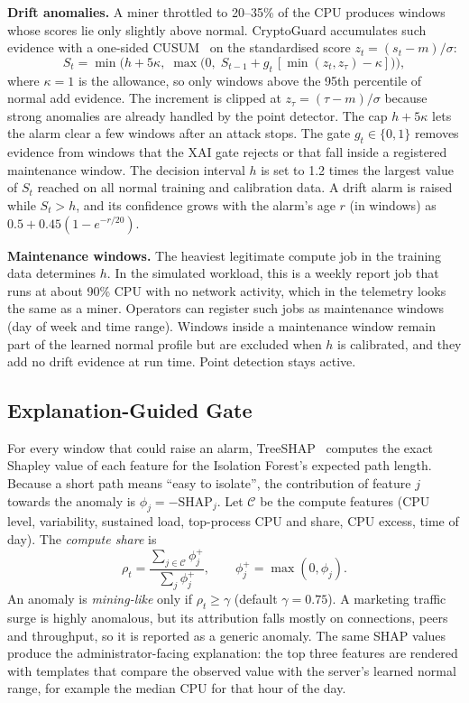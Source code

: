 \documentclass[conference]{IEEEtran}
\begin{document}
\textbf{Drift anomalies.} A miner throttled to 20--35\% of the CPU produces windows whose scores lie only slightly above normal. CryptoGuard accumulates such evidence with a one-sided CUSUM~\cite{page1954} on the standardised score $z_t=(s_t-m)/\sigma$:
\begin{equation}
  S_t = \min\!\Big(h + 5\kappa,\; \max\!\big(0,\; S_{t-1} + g_t\,[\min(z_t, z_\tau) - \kappa]\big)\Big),
  \label{eq:cusum}
\end{equation}
where $\kappa=1$ is the allowance, so only windows above the 95th percentile of normal add evidence. The increment is clipped at $z_\tau=(\tau-m)/\sigma$ because strong anomalies are already handled by the point detector. The cap $h+5\kappa$ lets the alarm clear a few windows after an attack stops. The gate $g_t\in\{0,1\}$ removes evidence from windows that the XAI gate rejects or that fall inside a registered maintenance window. The decision interval $h$ is set to 1.2 times the largest value of $S_t$ reached on all normal training and calibration data. A drift alarm is raised while $S_t>h$, and its confidence grows with the alarm's age $r$ (in windows) as $0.5+0.45(1-e^{-r/20})$.

\textbf{Maintenance windows.} The heaviest legitimate compute job in the training data determines $h$. In the simulated workload, this is a weekly report job that runs at about 90\% CPU with no network activity, which in the telemetry looks the same as a miner. Operators can register such jobs as maintenance windows (day of week and time range). Windows inside a maintenance window remain part of the learned normal profile but are excluded when $h$ is calibrated, and they add no drift evidence at run time. Point detection stays active.

\subsection{Explanation-Guided Gate}
For every window that could raise an alarm, TreeSHAP~\cite{lundberg2020trees} computes the exact Shapley value of each feature for the Isolation Forest's expected path length. Because a short path means ``easy to isolate'', the contribution of feature $j$ towards the anomaly is $\phi_j=-\mathrm{SHAP}_j$. Let $\mathcal{C}$ be the compute features (CPU level, variability, sustained load, top-process CPU and share, CPU excess, time of day). The \emph{compute share} is
\begin{equation}
  \rho_t = \frac{\sum_{j\in\mathcal{C}} \phi_j^+}{\sum_j \phi_j^+}, \qquad \phi_j^+=\max(0,\phi_j).
\end{equation}
An anomaly is \emph{mining-like} only if $\rho_t\ge\gamma$ (default $\gamma=0.75$). A marketing traffic surge is highly anomalous, but its attribution falls mostly on connections, peers and throughput, so it is reported as a generic anomaly. The same SHAP values produce the administrator-facing explanation: the top three features are rendered with templates that compare the observed value with the server's learned normal range, for example the median CPU for that hour of the day.
\end{document}
